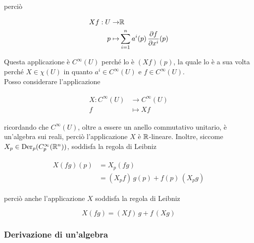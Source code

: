 perciò

\begin{align}
	\begin{split}
		X f : U \to& \mathbb{R}\\
		p \mapsto& \sum_{i=1}^{n} a^{i}(p) \, \dfrac{\partial f}{\partial x^{i}} (p)
	\end{split}
\end{align}

Questa applicazione è $ C^{\infty}(U) $ perché lo è $ (X f) (p) $, la quale lo è a sua volta perché $ X \in \chi(U) $ in quanto $ a^{i} \in C^{\infty}(U) $ e $ f \in C^{\infty}(U) $.\\
Posso considerare l'applicazione

\begin{align}
	\begin{split}
		X : C^{\infty}(U) &\to C^{\infty}(U)\\
		f &\mapsto X f
	\end{split}
\end{align}

ricordando che $ C^{\infty}(U) $, oltre a essere un anello commutativo unitario, è un'algebra sui reali, perciò l'applicazione $ X $ è $ \mathbb{R} $-lineare. Inoltre, siccome $ X_{p} \in \operatorname{Der}_{p}(C_{p}^{\infty}(\mathbb{R}^{n})) $, soddisfa la regola di Leibniz

\begin{align}
	\begin{split}
		X (f g) (p) &= X_{p} (f g)\\
		&= (X_{p} f) \, g(p) + f(p) \, (X_{p} g) 
	\end{split}
\end{align}

perciò anche l'applicazione $ X $ soddisfa la regola di Leibniz

\begin{equation}
	X (f g) = (X f) \, g + f \, (X g)
\end{equation}

\subsubsection{Derivazione di un'algebra}

